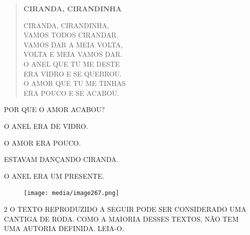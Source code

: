 \begin{myquote}
\begin{verse}
\textbf{CIRANDA, CIRANDINHA}

CIRANDA, CIRANDINHA,\\
VAMOS TODOS CIRANDAR.\\
VAMOS DAR A MEIA VOLTA,\\
VOLTA E MEIA VAMOS DAR.\\
O ANEL QUE TU ME DESTE\\
ERA VIDRO E SE QUEBROU.\\
O AMOR QUE TU ME TINHAS\\
ERA POUCO E SE ACABOU.
\end{verse}

\end{myquote}

POR QUE O AMOR ACABOU?

\begin{escolha}[itemsep=0pt]
\item O ANEL ERA DE VIDRO.

\item O AMOR ERA POUCO.

\item ESTAVAM DANÇANDO CIRANDA.

\item O ANEL ERA UM PRESENTE.
\end{escolha}

\begin{minipage}{.5\textwidth}
\end{minipage}
\hspace{0.5cm}
\begin{minipage}{.5\textwidth}
\begin{figure}[H]
\centering
\texttt{[image: media/image267.png]}
\end{figure}
\end{minipage}

\num{2} O TEXTO REPRODUZIDO A SEGUIR PODE SER 
CONSIDERADO UMA CANTIGA DE RODA. COMO A MAIORIA DESSES
TEXTOS, NÃO TEM UMA AUTORIA DEFINIDA. LEIA-O.


